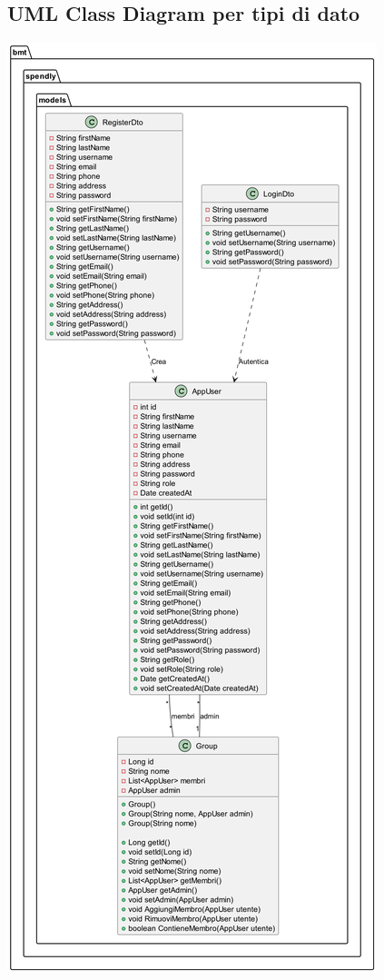\subsection{UML Class Diagram per tipi di dato}

\begin{center}
    \includegraphics[scale=0.15]{images/ClassDiagram.png}
\end{center}
